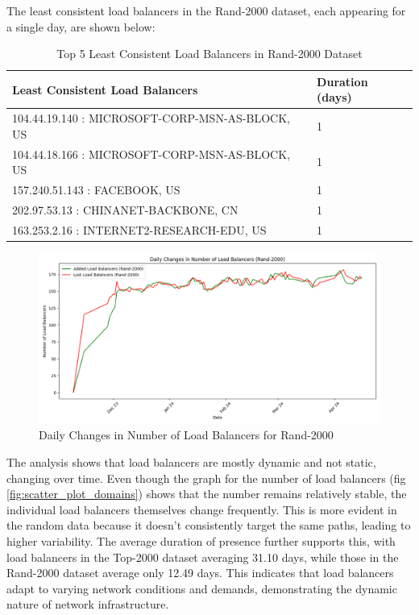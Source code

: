 \documentclass[12pt]{cwru_thesis}
\begin{document}
The least consistent load balancers in the Rand-2000 dataset, each appearing for a single day, are shown below:

\begin{table}[h!]
    \centering
    \begin{tabular}{|l|l|}
        \hline
        \textbf{Least Consistent Load Balancers} & \textbf{Duration (days)} \\ \hline
        104.44.19.140 : MICROSOFT-CORP-MSN-AS-BLOCK, US & 1 \\ \hline
        104.44.18.166 : MICROSOFT-CORP-MSN-AS-BLOCK, US & 1 \\ \hline
        157.240.51.143 : FACEBOOK, US & 1 \\ \hline
        202.97.53.13 : CHINANET-BACKBONE, CN & 1 \\ \hline
        163.253.2.16 : INTERNET2-RESEARCH-EDU, US & 1 \\ \hline
    \end{tabular}
    \caption{Top 5 Least Consistent Load Balancers in Rand-2000 Dataset}
\end{table}

\begin{figure}[h!]
    \centering
    \includegraphics[width=\linewidth]{figures/load_balancer_changes_Rand-2000.png}
    \caption{Daily Changes in Number of Load Balancers for Rand-2000}
    \label{fig:rand2000_changes}
\end{figure}

The analysis shows that load balancers are mostly dynamic and not static, changing over time. Even though the graph for the number of load balancers (fig \ref{fig:scatter_plot_domains}) shows that the number remains relatively stable, the individual load balancers themselves change frequently. This is more evident in the random data because it doesn't consistently target the same paths, leading to higher variability. The average duration of presence further supports this, with load balancers in the Top-2000 dataset averaging 31.10 days, while those in the Rand-2000 dataset average only 12.49 days. This indicates that load balancers adapt to varying network conditions and demands, demonstrating the dynamic nature of network infrastructure.
\end{document}
